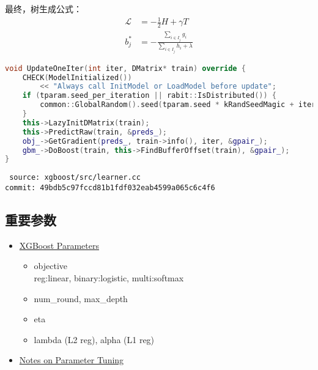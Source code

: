 \begin{frame}[fragile]
    最终，树生成公式：
    \begin{align*}
        \mathcal{L} &= - \frac{1}{2} H + \gamma T \\
        b^*_j &= - \frac{\sum_{i \in I_j} g_i}{\sum_{i \in I_j} h_i + \lambda}
    \end{align*}

    \begin{lstlisting}[language=C++,style=myScalastyle]
void UpdateOneIter(int iter, DMatrix* train) override {
    CHECK(ModelInitialized())
        << "Always call InitModel or LoadModel before update";
    if (tparam.seed_per_iteration || rabit::IsDistributed()) {
        common::GlobalRandom().seed(tparam.seed * kRandSeedMagic + iter);
    }
    this->LazyInitDMatrix(train);
    this->PredictRaw(train, &preds_);
    obj_->GetGradient(preds_, train->info(), iter, &gpair_);
    gbm_->DoBoost(train, this->FindBufferOffset(train), &gpair_);
}
    \end{lstlisting}
    {\tiny \tt
    source: xgboost/src/learner.cc \\[-2ex]
    commit: 49bdb5c97fccd81b1fdf032eab4599a065c6c4f6}
\end{frame}


\subsection{重要参数}


\begin{frame}
    \begin{itemize}
        \item \href{https://github.com/dmlc/xgboost/blob/master/doc/parameter.md}{XGBoost Parameters}
            \begin{itemize}
                \item objective \\
                      reg:linear, binary:logistic, multi:softmax
                \item num\_round, max\_depth
                \item eta
                \item lambda (L2 reg), alpha (L1 reg)
            \end{itemize}

        \item \href{https://github.com/dmlc/xgboost/blob/master/doc/how_to/param_tuning.md}{Notes on Parameter Tuning}
    \end{itemize}
\end{frame}
